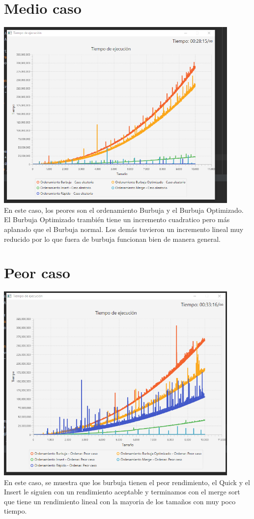 \documentclass{article}
\begin{document}
\section{Medio caso}
\includegraphics[width=12cm]{medio.png}\\
En este caso, los peores son el ordenamiento Burbuja y el Burbuja Optimizado. El Burbuja Optimizado trambién tiene un incremento 
cuadratico pero más aplanado que el Burbuja normal. Los demás tuvieron un incremento lineal muy reducido por lo que fuera de 
burbuja funcionan bien de manera general.
\maketitle
\section{Peor caso}
\includegraphics[width=12cm]{peor.png}\\
En este caso, se muestra que los burbuja tienen el peor rendimiento, el Quick y el Insert le siguien con un rendimiento aceptable
y terminamos con el merge sort que tiene un rendimiento lineal con la mayoria de los tamaños con muy poco tiempo.
\maketitle
\end{document}
